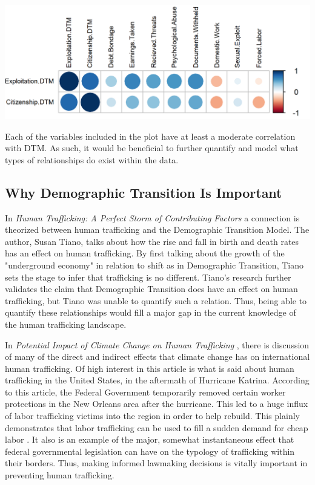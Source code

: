 \documentclass{article} %
\begin{document}
\hspace*{-1.5cm}
\includegraphics{Corrplot} \bigskip

Each of the variables included in the plot have at least a moderate correlation with DTM. As such, it would be beneficial to further quantify and model what types of relationships do exist within the data.


\subsection{Why Demographic Transition Is Important}

In \emph{Human Trafficking: A Perfect Storm of Contributing Factors} \parencite{SlaveBook} a connection is theorized between human trafficking and the Demographic Transition Model. The author, Susan Tiano, talks about how the rise and fall in birth and death rates has an effect on human trafficking. By first talking about the growth of the "underground economy" in relation to shift as in Demographic Transition, Tiano sets the stage to infer that trafficking is no different. Tiano's research further validates the claim that Demographic Transition does have an effect on human trafficking, but Tiano was unable to quantify such a relation. Thus, being able to quantify these relationships would fill a major gap in the current knowledge of the human trafficking landscape.

In \emph{Potential Impact of Climate Change on Human Trafficking} \parencite{Climate}, there is discussion of many of the direct and indirect effects that climate change has on international human trafficking. Of high interest in this article is what is said about human trafficking in the United States, in the aftermath of Hurricane Katrina. According to this article, the Federal Government temporarily removed certain worker protections in the New Orleans area after the hurricane. This led to a huge influx of labor trafficking victims into the region in order to help rebuild. This plainly demonstrates that labor trafficking can be used to fill a sudden demand for cheap labor \parencite{Climate}. It also is an example of the major, somewhat instantaneous effect that federal governmental legislation can have on the typology of trafficking within their borders. Thus, making informed lawmaking decisions is vitally important in preventing human trafficking.
\end{document}
